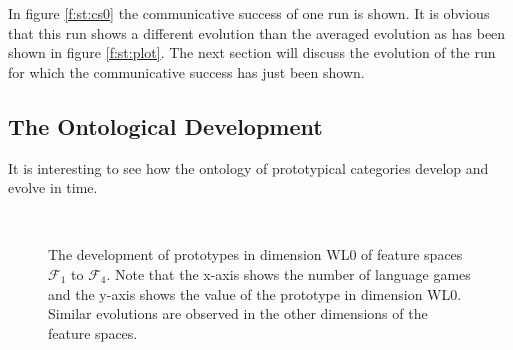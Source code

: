 In figure \ref{f:st:cs0} the communicative success of one run is shown. It is obvious that this run shows a different evolution than the averaged evolution as has been shown in figure \ref{f:st:plot}. The next section will discuss the evolution of the run for which the communicative success has just been shown.

\subsection{The Ontological Development}\label{s:cat:evol}

It is interesting to see how the ontology of prototypical categories develop and evolve in time.

\begin{figure}[t]
\centering
{}
\\
\caption{The development of prototypes in dimension WL0 of feature spaces ${\mathcal F}_1$ to ${\mathcal F}_4$. Note that the x-axis shows the number of language games and the y-axis shows the value of the prototype in dimension WL0. Similar evolutions are observed in the other dimensions of the feature spaces.}
\label{f:cat:evol1}
\end{figure}


